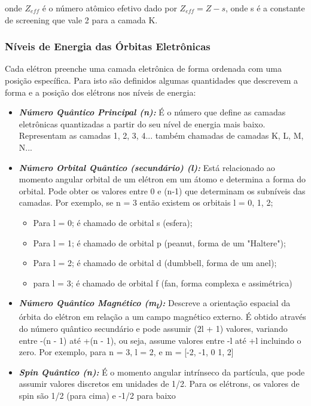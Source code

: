 \documentclass[11pt,a4paper]{article}
\newcounter{exemplo}
\begin{document}
                onde $Z_{eff}$ é o número atômico efetivo dado por $Z_{eff} = Z - s$, onde s é a constante de screening que vale 2 para a camada K.

            \subsubsection{Níveis de Energia das Órbitas Eletrônicas}

                
                Cada elétron preenche uma camada eletrônica de forma ordenada com uma posição específica. Para isto são definidos algumas quantidades que descrevem a forma e a posição dos elétrons nos níveis de energia:

                \begin{itemize}
                    \item \textbf{\textit{\textcolor{CarnationPink}{Número Quântico Principal (n):}}} É o número que define as camadas eletrônicas quantizadas a partir do seu nível de energia mais baixo. Representam as camadas 1, 2, 3, 4... também chamadas de camadas K, L, M, N... 
                    \item \textbf{\textit{\textcolor{CarnationPink}{Número Orbital Quântico (secundário) (l):}}} Está relacionado ao momento angular orbital de um elétron em um átomo e determina a forma do orbital. Pode obter os valores entre 0 e (n-1) que determinam os subníveis das camadas. Por exemplo, se n = 3 então existem os orbitais l = 0, 1, 2;
                        \begin{itemize}
                            \item Para l = 0; é chamado de orbital s (esfera);
                            \item Para l = 1; é chamado de orbital p (peanut, forma de um "Haltere");
                            \item Para l = 2; é chamado de orbital d (dumbbell, forma de um anel);
                            \item para l = 3; é chamado de orbital f (fan, forma complexa e assimétrica) 
                        \end{itemize}
                    \item \textbf{\textit{\textcolor{CarnationPink}{Número Quântico Magnético (m\textsubscript{l}):}}} Descreve a orientação espacial da órbita do elétron em relação a um campo magnético externo. É obtido através do número quântico secundário e pode assumir (2l + 1) valores, variando entre -(n - 1) até +(n - 1), ou seja, assume valores entre -l até +l incluindo o zero. Por exemplo, para n = 3, l = 2, e m = [-2, -1, 0 1, 2]
                    \item \textbf{\textit{\textcolor{CarnationPink}{Spin Quântico (n):}}} É o momento angular intrínseco da partícula, que pode assumir valores discretos em unidades de 1/2. Para os elétrons, os valores de spin são 1/2 (para cima) e -1/2 para baixo
                \end{itemize}
\end{document}
